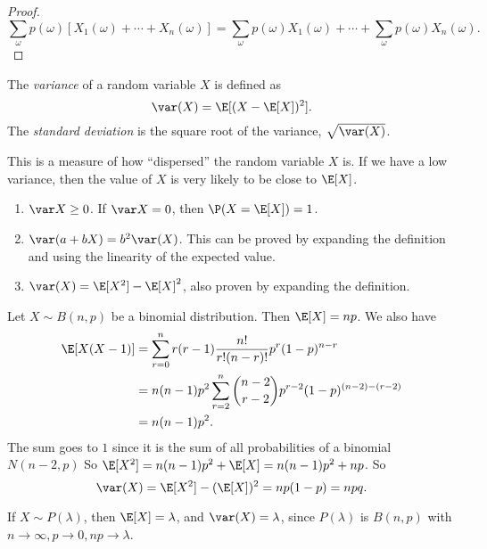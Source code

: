 \documentclass[a4paper]{article}
\begin{document}
\begin{proof}
  \[
    \sum_\omega p(\omega)[X_1(\omega) + \cdots + X_n(\omega)] = \sum_\omega p(\omega)X_1(\omega) + \cdots + \sum_\omega p(\omega) X_n(\omega).
  \]
\end{proof}

\begin{defi}
  The \emph{variance} of a random variable $X$ is defined as
  \[
    \var(X) = \E[(X - \E[X])^2].
  \]
  The \emph{standard deviation} is the square root of the variance, $\sqrt{\var(X)}$.
\end{defi}
This is a measure of how ``dispersed'' the random variable $X$ is. If we have a low variance, then the value of $X$ is very likely to be close to $\E[X]$.

\begin{thm}\leavevmode
  \begin{enumerate}
    \item $\var X \geq 0$. If $\var X = 0$, then $\P(X = \E[X]) = 1$.
    \item $\var (a + bX) = b^2 \var(X)$. This can be proved by expanding the definition and using the linearity of the expected value.
    \item $\var(X) = \E[X^2] - \E[X]^2$, also proven by expanding the definition.
  \end{enumerate}
\end{thm}

\begin{eg}
  Let $X\sim B(n, p)$ be a binomial distribution. Then $\E[X] = np$. We also have
  \begin{align*}
    \E[X(X - 1)] &=  \sum_{r = 0}^n r(r - 1)\frac{n!}{r!(n - r)!} p^r(1 - p)^{n - r}\\
    &= n(n - 1)p^2\sum_{r = 2}^n \binom{n - 2}{r - 2} p^{r - 2}(1 - p)^{(n - 2) - (r - 2)}\\
    &= n(n - 1)p^2.
  \end{align*}
  The sum goes to $1$ since it is the sum of all probabilities of a binomial $N(n - 2, p)$
  So $\E[X^2] = n(n - 1)p^2 + \E[X] = n(n - 1)p^2 + np$. So
  \[
    \var(X) = \E[X^2] - (\E[X])^2  = np(1 - p) = npq.
  \]
\end{eg}

\begin{eg}
  If $X\sim P(\lambda)$, then $\E[X] = \lambda$, and $\var(X) = \lambda$, since $P(\lambda)$ is $B(n, p)$ with $n\to \infty, p \to 0, np \to \lambda$.
\end{eg}
\end{document}
